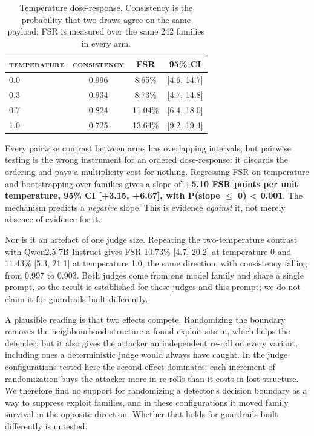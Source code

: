 \documentclass[conference]{IEEEtran}
\begin{document}
\begin{table}[t]
\centering
\caption{Temperature dose-response. Consistency is the probability that two draws agree on the same payload; FSR is measured over the same 242 families in every arm.}
\label{tab:5}
\small
\begin{tabular}{lccc}
\toprule
\textsc{temperature} & \textsc{consistency} & \textsc{FSR} & \textsc{95\% CI} \\
\midrule
0.0 & 0.996 & 8.65\% & [4.6, 14.7] \\
0.3 & 0.934 & 8.73\% & [4.7, 14.8] \\
0.7 & 0.824 & 11.04\% & [6.4, 18.0] \\
1.0 & 0.725 & 13.64\% & [9.2, 19.4] \\
\bottomrule
\end{tabular}
\end{table}


Every pairwise contrast between arms has overlapping intervals, but pairwise testing is the wrong instrument for an ordered dose-response: it discards the ordering and pays a multiplicity cost for nothing. Regressing FSR on temperature and bootstrapping over families gives a slope of \textbf{+5.10 FSR points per unit temperature, 95\% CI [+3.15, +6.67], with P(slope $\le$ 0) \textless{} 0.001}. The mechanism predicts a \textit{negative} slope. This is evidence \textit{against} it, not merely absence of evidence for it.

Nor is it an artefact of one judge size. Repeating the two-temperature contrast with Qwen2.5-7B-Instruct gives FSR 10.73\% [4.7, 20.2] at temperature 0 and 11.43\% [5.3, 21.1] at temperature 1.0, the same direction, with consistency falling from 0.997 to 0.903. Both judges come from one model family and share a single prompt, so the result is established for these judges and this prompt; we do not claim it for guardrails built differently.

A plausible reading is that two effects compete. Randomizing the boundary removes the neighbourhood structure a found exploit sits in, which helps the defender, but it also gives the attacker an independent re-roll on every variant, including ones a deterministic judge would always have caught. In the judge configurations tested here the second effect dominates: each increment of randomization buys the attacker more in re-rolls than it costs in lost structure. We therefore find no support for randomizing a detector's decision boundary as a way to suppress exploit families, and in these configurations it moved family survival in the opposite direction. Whether that holds for guardrails built differently is untested.
\end{document}
